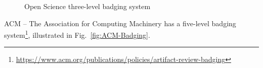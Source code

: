\documentclass[journal,twoside]{IEEEtran}
\providecommand{\DIFadd}[1]{{\protect\color{blue}\uwave{#1}}} %
\providecommand{\DIFaddFL}[1]{\DIFadd{#1}} %
\providecommand{\DIFaddbeginFL}{} %
\providecommand{\DIFaddendFL}{} %
\providecommand{\DIFdelbeginFL}{} %
\providecommand{\DIFdelendFL}{} %
\newcommand{\DIFscaledelfig}{0.5}
\newlength{\DIFdelgraphicswidth} %
\newlength{\DIFdelgraphicsheight} %
\newcommand{\DIFaddincludegraphics}[2][]{{\color{blue}\fbox{\DIFOincludegraphics[#1]{#2}}}} %
\newcommand{\DIFdelincludegraphics}[2][]{%
\sbox{\DIFdelgraphicsbox}{\DIFOincludegraphics[#1]{#2}}%
\settoboxwidth{\DIFdelgraphicswidth}{\DIFdelgraphicsbox} %
\settoboxtotalheight{\DIFdelgraphicsheight}{\DIFdelgraphicsbox} %
\scalebox{\DIFscaledelfig}{%
\parbox[b]{\DIFdelgraphicswidth}{\usebox{\DIFdelgraphicsbox}\\[-\baselineskip] \rule{\DIFdelgraphicswidth}{0em}}\llap{\resizebox{\DIFdelgraphicswidth}{\DIFdelgraphicsheight}{%
\setlength{\unitlength}{\DIFdelgraphicswidth}%
\begin{picture}(1,1)%
\thicklines\linethickness{2pt} %
{\color[rgb]{1,0,0}\put(0,0){\framebox(1,1){}}}%
{\color[rgb]{1,0,0}\put(0,0){\line( 1,1){1}}}%
{\color[rgb]{1,0,0}\put(0,1){\line(1,-1){1}}}%
\end{picture}%
}\hspace*{3pt}}} %
} %
\DeclareRobustCommand{\DIFaddbeginFL}{\DIFOaddbeginFL \let\includegraphics\DIFaddincludegraphics} %
\DeclareRobustCommand{\DIFaddendFL}{\DIFOaddendFL \let\includegraphics\DIFOincludegraphics} %
\DeclareRobustCommand{\DIFdelbeginFL}{\DIFOdelbeginFL \let\includegraphics\DIFdelincludegraphics} %
\DeclareRobustCommand{\DIFdelendFL}{\DIFOaddendFL \let\includegraphics\DIFOincludegraphics} %
\begin{document}
\begin{figure}[hbt]
	\centering
	\DIFdelbeginFL %
\DIFdelendFL \DIFaddbeginFL {}
	\DIFaddendFL \caption{Open Science three-level badging system\DIFaddbeginFL \DIFaddFL{.}\DIFaddendFL }\label{Fig:OpenScienceBadges}
\end{figure}

ACM -- The Association for Computing Machinery has a five-level badging system\footnote{ \url{https://www.acm.org/publications/policies/artifact-review-badging}}, illustrated in Fig.~\ref{fig:ACM-Badging}.
\end{document}

